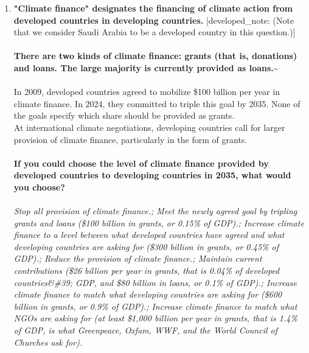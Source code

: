 \begin{enumerate}[resume]
\item  \label{q:ncqg} \textbf{"Climate finance" designates the financing of climate action from developed countries in developing countries.} [developed\_note: (Note that we consider Saudi Arabia to be a developed country in this question.)]\\\\\textbf{There are two kinds of climate finance: grants (that is, donations) and loans. The large majority is currently provided as loans.\~}\\\\In 2009, developed countries agreed to mobilize \$100 billion per year in climate finance. In 2024, they committed to triple this goal by 2035. None of the goals specify which share should be provided as grants.\~\\At international climate negotiations, developing countries call for larger provision of climate finance, particularly in the form of grants.\\\\\textbf{If you could choose the level of climate finance provided by developed countries to developing countries in 2035, what would you choose?}\\ [\textit{Figure \ref{fig:ncqg}}; 
\verb|ncqg|]
  \\ \textit{Stop all provision of climate finance.; Meet the newly agreed goal by tripling grants and loans (\$100 billion in grants, or 0.15\% of GDP).; Increase climate finance to a level between what developed countries have agreed and what developing countries are asking for (\$300 billion in grants, or 0.45\% of GDP).; Reduce the provision of climate finance.; Maintain current contributions (\$26 billion per year in grants, that is 0.04\% of developed countries\&\#39; GDP, and \$80 billion in loans, or 0.1\% of GDP).; Increase climate finance to match what developing countries are asking for (\$600 billion in grants, or 0.9\% of GDP).; Increase climate finance to match what NGOs are asking for (at least \$1,000 billion per year in grants, that is 1.4\% of GDP, is what Greenpeace, Oxfam, WWF, and the World Council of Churches ask for).}

\end{enumerate} 

